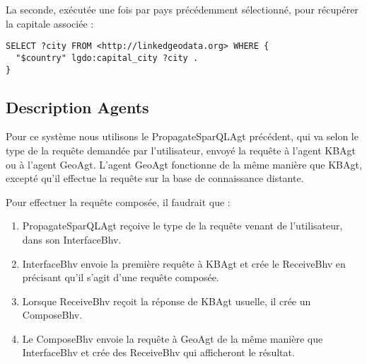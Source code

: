 \documentclass[a4paper,11pt]{article}
\begin{document}
La seconde, exécutée une fois par pays précédemment sélectionné, pour récupérer la capitale associée :
\begin{lstlisting}[language=SPARQL]
SELECT ?city FROM <http://linkedgeodata.org> WHERE { 
  "$country" lgdo:capital_city ?city .
} 
\end{lstlisting}
\subsection{Description Agents}
Pour ce système nous utilisons le PropagateSparQLAgt précédent, qui va selon le type de la requête demandée par l'utilisateur, envoyé la requête à l'agent KBAgt ou à l'agent GeoAgt.
L'agent GeoAgt fonctionne de la même manière que KBAgt, excepté qu'il effectue la requête sur la base de connaissance distante.

Pour effectuer la requête composée, il faudrait que :
\begin{enumerate}
\item PropagateSparQLAgt reçoive le type de la requête venant de l'utilisateur, dans son InterfaceBhv.
\item InterfaceBhv envoie la première requête à KBAgt et crée le ReceiveBhv en précisant qu'il s'agit d'une requête composée. 
\item Lorsque ReceiveBhv reçoit la réponse de KBAgt usuelle, il crée un ComposeBhv.
\item Le ComposeBhv envoie la requête à GeoAgt de la même manière que InterfaceBhv et crée des ReceiveBhv qui afficheront le résultat.
\end{enumerate}
 
\end{document}
